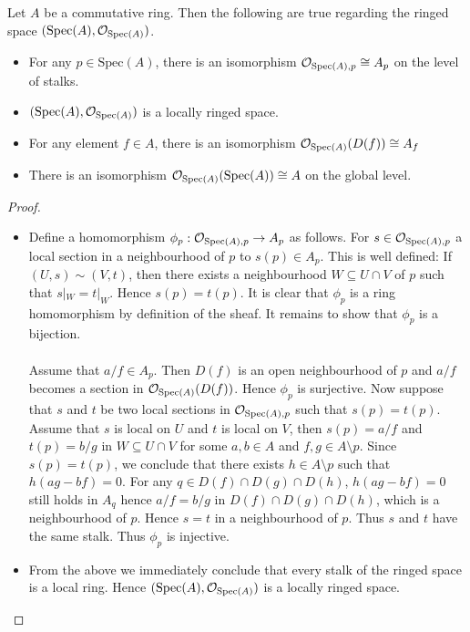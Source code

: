 \documentclass[a4paper]{article}
\begin{document}
\begin{prp}{}{} Let $A$ be a commutative ring. Then the following are true regarding the ringed space $(\text{Spec}(A),\mathcal{O}_{\text{Spec}(A)})$. 
\begin{itemize}
\item For any $p\in\text{Spec}(A)$, there is an isomorphism $\mathcal{O}_{\text{Spec}(A),p}\cong A_p$ on the level of stalks. 
\item $(\text{Spec}(A),\mathcal{O}_{\text{Spec}(A)})$ is a locally ringed space. 
\item For any element $f\in A$, there is an isomorphism $\mathcal{O}_{\text{Spec}(A)}(D(f))\cong A_f$
\item There is an isomorphism $\mathcal{O}_{\text{Spec}(A)}(\text{Spec}(A))\cong A$ on the global level. 
\end{itemize} \tcbline
\begin{proof}~\\
\begin{itemize}
\item Define a homomorphism $\phi_p:\mathcal{O}_{\text{Spec}(A),p}\to A_p$ as follows. For $s\in\mathcal{O}_{\text{Spec}(A),p}$ a local section in a neighbourhood of $p$ to $s(p)\in A_p$. This is well defined: If $(U,s)\sim(V,t)$, then there exists a neighbourhood $W\subseteq U\cap V$ of $p$ such that $s|_W=t|_W$. Hence $s(p)=t(p)$. It is clear that $\phi_p$ is a ring homomorphism by definition of the sheaf. It remains to show that $\phi_p$ is a bijection. \\~\\

Assume that $a/f\in A_p$. Then $D(f)$ is an open neighbourhood of $p$ and $a/f$ becomes a section in $\mathcal{O}_{\text{Spec}(A)}(D(f))$. Hence $\phi_p$ is surjective. Now suppose that $s$ and $t$ be two local sections in $\mathcal{O}_{\text{Spec}(A),p}$ such that $s(p)=t(p)$. Assume that $s$ is local on $U$ and $t$ is local on $V$, then $s(p)=a/f$ and $t(p)=b/g$ in $W\subseteq U\cap V$ for some $a,b\in A$ and $f,g\in A\setminus p$. Since $s(p)=t(p)$, we conclude that there exists $h\in A\setminus p$ such that $h(ag-bf)=0$. For any $q\in D(f)\cap D(g)\cap D(h)$, $h(ag-bf)=0$ still holds in $A_q$ hence $a/f=b/g$ in $D(f)\cap D(g)\cap D(h)$, which is a neighbourhood of $p$. Hence $s=t$ in a neighbourhood of $p$. Thus $s$ and $t$ have the same stalk. Thus $\phi_p$ is injective. 

\item From the above we immediately conclude that every stalk of the ringed space is a local ring. Hence $(\text{Spec}(A),\mathcal{O}_{\text{Spec}(A)})$ is a locally ringed space. 


\end{itemize}
\end{proof}
\end{prp}
\end{document}
